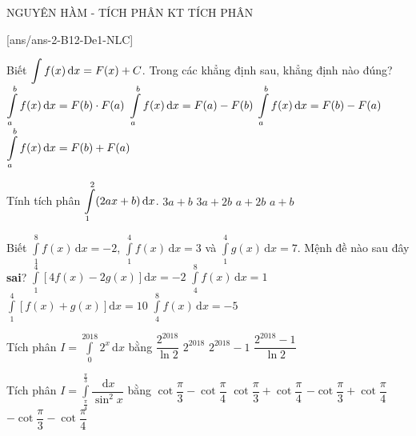\begin{name}
	{NGUYÊN HÀM - TÍCH PHÂN}
	{KT TÍCH PHÂN}
	{\tentruong}
	{\thoigian}
\end{name}
\setcounter{ex}{0}\setcounter{bt}{0}
[ans/ans-2-B12-De1-NLC]
\TN
\begin{ex}%
	Biết $\displaystyle\displaystyle\int\limits f(x) \mathrm{\,d} x=F(x)+C$. Trong các khẳng định sau, khẳng định nào đúng?
	\choice 
		{$\displaystyle\displaystyle\int\limits\limits_a^b f(x) \mathrm{\,d} x=F(b) \cdot F(a)$}
		{$\displaystyle\displaystyle\int\limits\limits_a^b f(x) \mathrm{\,d}x=F(a)-F(b)$}
		{\True $\displaystyle\displaystyle\int\limits\limits_a^b f(x) \mathrm{\,d}x=F(b)-F(a)$}
		{$\displaystyle\displaystyle\int\limits\limits_a^b f(x) \mathrm{\,d} x=F(b)+F(a)$}
\end{ex}
\begin{ex}%
	Tính tích phân $\displaystyle\displaystyle\int\limits\limits_1^2(2a x+b) \mathrm{\,d} x$.
	\choice 
		{\True $3a+b$}
		{$3a+2b$}
		{$a+2 b$}
		{$a+b$}
\end{ex}
\begin{ex}%
	Biết $\displaystyle\int\limits_1^8 f(x) \mathrm{\,d} x=-2$, $\displaystyle\int\limits_1^4 f(x) \mathrm{\,d} x=3$ và $\displaystyle\int\limits_1^4 g(x) \mathrm{\,d} x=7$. Mệnh đề nào sau đây \textbf{sai}?
	\choice 
		{$\displaystyle\int\limits_1^4\left[4 f(x)-2 g(x)\right] \mathrm{d} x=-2$}
		{$\displaystyle\int\limits_4^8 f(x) \mathrm{\,d} x=1$}
		{$\displaystyle\int\limits_1^4\left[f(x)+g(x)\right] \mathrm{d} x=10$}
		{\True $\displaystyle\int\limits_4^8 f(x) \mathrm{\,d} x=-5$}
\end{ex}
\begin{ex}%
	Tích phân $I=\displaystyle\int\limits_0^{2018} 2^x \mathrm{\,d} x$ bằng
	 \choice 
		{$\dfrac{2^{2018}}{\ln 2}$}
		{$2^{2018}$}
		{$2^{2018}-1$}
		{\True $\dfrac{2^{2018}-1}{\ln 2}$}
\end{ex}
\begin{ex}%
	Tích phân $I=\displaystyle\int\limits_{\tfrac{\pi}{4}}^{\tfrac{\pi}{3}} \dfrac{\mathrm{\,d} x}{\sin ^2 x}$ bằng
	\choice 
		 {$\cot \dfrac{\pi}{3}-\cot \dfrac{\pi}{4}$} 
		 {$\cot \dfrac{\pi}{3}+\cot \dfrac{\pi}{4}$}
		 {\True $-\cot \dfrac{\pi}{3}+\cot \dfrac{\pi}{4}$}
	 	 {$-\cot \dfrac{\pi}{3}-\cot \dfrac{\pi}{4}$}
\end{ex}
